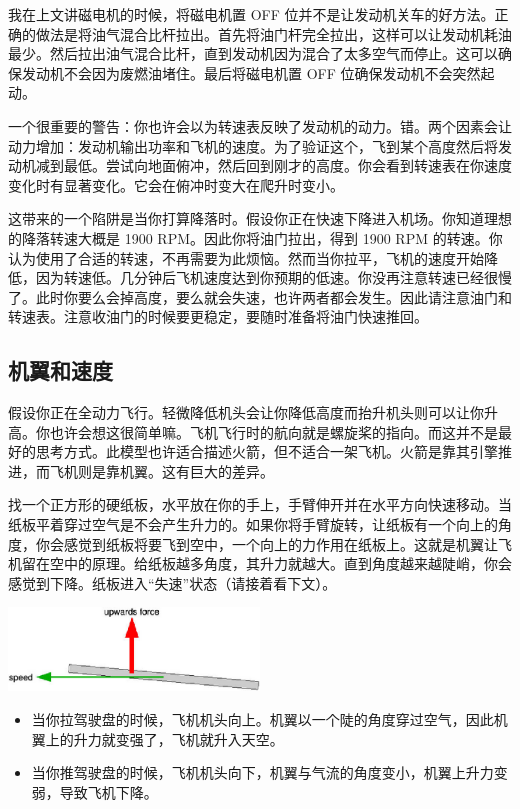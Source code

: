 我在上文讲磁电机的时候，将磁电机置 OFF 位并不是让发动机关车的好方法。正确的做法是将油气混合比杆拉出。首先将油门杆完全拉出，这样可以让发动机耗油最少。然后拉出油气混合比杆，直到发动机因为混合了太多空气而停止。这可以确保发动机不会因为废燃油堵住。最后将磁电机置 OFF 位确保发动机不会突然起动。

一个很重要的警告：你也许会以为转速表反映了发动机的动力。错。两个因素会让动力增加：发动机输出功率和飞机的速度。为了验证这个，飞到某个高度然后将发动机减到最低。尝试向地面俯冲，然后回到刚才的高度。你会看到转速表在你速度变化时有显著变化。它会在俯冲时变大在爬升时变小。

这带来的一个陷阱是当你打算降落时。假设你正在快速下降进入机场。你知道理想的降落转速大概是 1900 RPM。因此你将油门拉出，得到 1900 RPM 的转速。你认为使用了合适的转速，不再需要为此烦恼。然而当你拉平，飞机的速度开始降低，因为转速低。几分钟后飞机速度达到你预期的低速。你没再注意转速已经很慢了。此时你要么会掉高度，要么就会失速，也许两者都会发生。因此请注意油门和转速表。注意收油门的时候要更稳定，要随时准备将油门快速推回。

\subsection{机翼和速度}
\label{sec:WingsAndForce}

假设你正在全动力飞行。轻微降低机头会让你降低高度而抬升机头则可以让你升高。你也许会想这很简单嘛。飞机飞行时的航向就是螺旋桨的指向。而这并不是最好的思考方式。此模型也许适合描述火箭，但不适合一架飞机。火箭是靠其引擎推进，而飞机则是靠机翼。这有巨大的差异。

找一个正方形的硬纸板，水平放在你的手上，手臂伸开并在水平方向快速移动。当纸板平着穿过空气是不会产生升力的。如果你将手臂旋转，让纸板有一个向上的角度，你会感觉到纸板将要飞到空中，一个向上的力作用在纸板上。这就是机翼让飞机留在空中的原理。给纸板越多角度，其升力就越大。直到角度越来越陡峭，你会感觉到下降。纸板进入“失速”状态（请接着看下文）。

\centerline{
  \includegraphics[width=0.5\textwidth]{img/basic_tutorial/lift}
}

\begin{itemize}
    \item 当你拉驾驶盘的时候，飞机机头向上。机翼以一个陡的角度穿过空气，因此机翼上的升力就变强了，飞机就升入天空。
    \item 当你推驾驶盘的时候，飞机机头向下，机翼与气流的角度变小，机翼上升力变弱，导致飞机下降。
\end{itemize}

